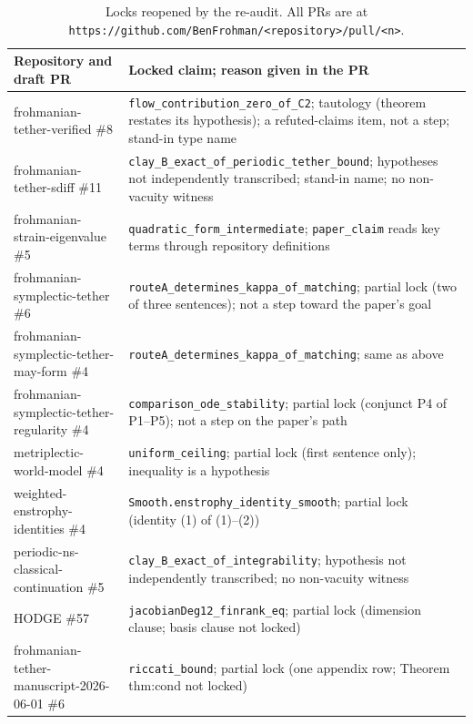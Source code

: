 \documentclass[11pt,a4paper]{article}
\newcommand{\code}[1]{\texttt{#1}}
\begin{document}
\begin{table}[ht]
\centering\footnotesize
\begin{tabularx}{\textwidth}{@{}>{\raggedright\arraybackslash}p{4.4cm}>{\raggedright\arraybackslash}X@{}}
\toprule
Repository and draft PR & Locked claim; reason given in the PR\\
\midrule
frohmanian-tether-verified \#8 & \code{flow\_contribution\_zero\_of\_C2}; tautology (theorem restates its hypothesis); a refuted-claims item, not a step; stand-in type name\\
frohmanian-tether-sdiff \#11 & \code{clay\_B\_exact\_of\_periodic\_tether\_bound}; hypotheses not independently transcribed; stand-in name; no non-vacuity witness\\
frohmanian-strain-eigenvalue \#5 & \code{quadratic\_form\_intermediate}; \code{paper\_claim} reads key terms through repository definitions\\
frohmanian-symplectic-tether \#6 & \code{routeA\_determines\_kappa\_of\_matching}; partial lock (two of three sentences); not a step toward the paper's goal\\
frohmanian-symplectic-tether-may-form \#4 & \code{routeA\_determines\_kappa\_of\_matching}; same as above\\
frohmanian-symplectic-tether-regularity \#4 & \code{comparison\_ode\_stability}; partial lock (conjunct P4 of P1--P5); not a step on the paper's path\\
metriplectic-world-model \#4 & \code{uniform\_ceiling}; partial lock (first sentence only); inequality is a hypothesis\\
weighted-enstrophy-identities \#4 & \code{Smooth.enstrophy\_identity\_smooth}; partial lock (identity (1) of (1)--(2))\\
periodic-ns-classical-continuation \#5 & \code{clay\_B\_exact\_of\_integrability}; hypothesis not independently transcribed; no non-vacuity witness\\
HODGE \#57 & \code{jacobianDeg12\_finrank\_eq}; partial lock (dimension clause; basis clause not locked)\\
frohmanian-tether-manuscript-2026-06-01 \#6 & \code{riccati\_bound}; partial lock (one appendix row; Theorem thm:cond not locked)\\
\bottomrule
\end{tabularx}
\caption{Locks reopened by the re-audit. All PRs are at \code{https://github.com/BenFrohman/<repository>/pull/<n>}.}
\label{tab:reaudit}
\end{table}
\end{document}
